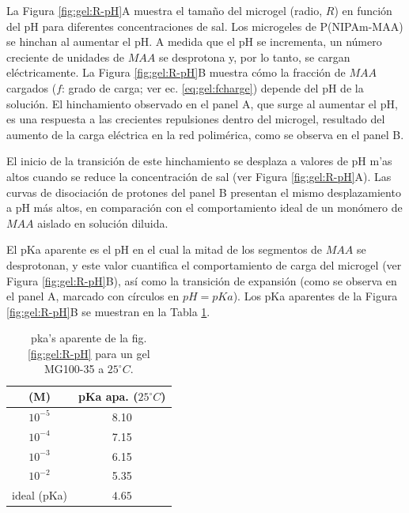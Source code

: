 La Figura \ref{fig:gel:R-pH}A muestra el tama\~no del microgel (radio, $R$) en funci\'on del pH para diferentes concentraciones de sal. Los microgeles de P(NIPAm-MAA) se hinchan al aumentar el pH. A medida que el pH se incrementa, un n\'umero creciente de unidades  de $MAA$ se desprotona y, por lo tanto, se cargan el\'ectricamente. La Figura \ref{fig:gel:R-pH}B muestra c\'omo la fracci\'on de $MAA$ cargados ($f$: grado de carga; ver ec. \ref{eq:gel:fcharge}) depende del pH de la soluci\'on. El hinchamiento observado en el panel A, que surge al aumentar el pH, es una respuesta a las crecientes repulsiones dentro del microgel, resultado del aumento de la carga el\'ectrica en la red polim\'erica, como se observa en el panel B.

El inicio de la transici\'on de este hinchamiento se desplaza a valores de pH m'as altos cuando se reduce la concentraci\'on de sal (ver Figura \ref{fig:gel:R-pH}A). Las curvas de disociaci\'on de protones del panel B presentan el mismo desplazamiento a pH m\'as altos, en comparaci\'on con el comportamiento ideal de un mon\'omero de $MAA$ aislado en soluci\'on diluida.%

El pKa aparente es el pH en el cual la mitad de los segmentos de $MAA$ se desprotonan, y este valor cuantifica el comportamiento de carga del microgel (ver Figura \ref{fig:gel:R-pH}B), as\'i como la transici\'on de expansi\'on (como se observa en el panel A, marcado con c\'irculos en $pH=pKa$). Los pKa aparentes de la Figura \ref{fig:gel:R-pH}B se muestran en la Tabla \ref{table:gel:pKa_app}.





\begin{table}[!htb]
\centering
\small
  \begin{tabular}{|cc|}
    \hline
      [KCl] (M)&  pKa apa. ($25 ^\circ C$)  \\
      \hline
    $10^{-5}$ & 8.10  \\
    $10^{-4}$ & 7.15 \\
    $10^{-3}$ & 6.15 \\
    $10^{-2}$ & 5.35 \\
    ideal (pKa) &  $4.65$  \\
    \hline
  \end{tabular}
 \caption{ pka's aparente de la fig. \ref{fig:gel:R-pH} para un gel MG100-35 a $25 ^\circ C$.}
\label{table:gel:pKa_app} 
\end{table}


